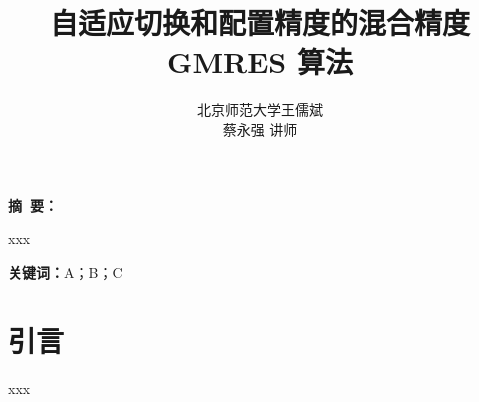 \documentclass[UTF8]{ctexart}
\newenvironment{reportabstract}{%
  \par\noindent\songti\zihao{-5} \textbf{摘\ 要：}%
}{\par}
\newcommand{\reportkeywords}[1]{%
  \par\noindent\songti\zihao{-5} \textbf{关键词：}#1\par
}
\begin{document}

\songti
{}

\title{%
  \heiti{}
  自适应切换和配置精度的混合精度 GMRES 算法
}

\author{%
  \kaishu{}
  北京师范大学\quad 王儒斌\\[0.5em]
  \kaishu{}
  蔡永强 讲师
}
\date{}
\maketitle


\begin{reportabstract}
xxx

\end{reportabstract}

\reportkeywords{A；B；C}

\section{引言}

xxx

\end{document}
